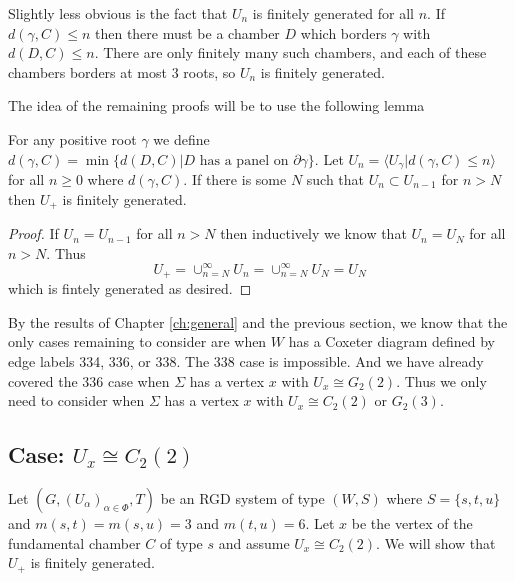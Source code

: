 \documentclass[class=book, crop=false]{standalone}
\begin{document}
Slightly less obvious is the fact that $U_n$ is finitely generated for all $n.$ If $d(\gamma,C)\le n$ then there must be a chamber $D$ which borders $\gamma$ with $d(D,C)\le n.$ There are only finitely many such chambers, and each of these chambers borders at most 3 roots, so $U_n$ is finitely generated.

The idea of the remaining proofs will be to use the following lemma
\begin{lemma} 
	For any positive root $\gamma$ we define $d(\gamma,C)=\min\{d(D,C)|D\text{ has a panel on }\partial \gamma\}.$ Let $U_n=\langle U_\gamma |d(\gamma,C)\le n\rangle$ for all $n\ge 0$ where $d(\gamma,C).$ If there is some $N$ such that $U_n\subset U_{n-1}$ for $n>N$ then $U_+$ is finitely generated.
	\label{lem:fgcond}
\end{lemma}
\begin{proof}
	If $U_n=U_{n-1}$ for all $n> N$ then inductively we know that $U_n=U_N$ for all $n>N.$ Thus
	\[
		U_+=\cup_{n=N}^{\infty}{U_n}=\cup_{n=N}^\infty U_N=U_N
	\]
	which is fintely generated as desired.
\end{proof}

By the results of Chapter \ref{ch:general} and the previous section, we know that the only cases remaining to consider are when $W$ has a Coxeter diagram defined by edge labels 334, 336, or 338. The 338 case is impossible. And we have already covered the 336 case when $\Sigma$ has a vertex $x$ with $U_x\cong G_2(2).$ Thus we only need to consider when $\Sigma$ has a vertex $x$ with $U_x\cong C_2(2)$ or $G_2(3).$

\subsection{Case: $U_x\cong C_2(2)$}

Let $(G,(U_\alpha)_{\alpha\in \Phi},T)$ be an RGD system of type $(W,S)$ where $S=\{s,t,u\}$ and $m(s,t)=m(s,u)=3$ and $m(t,u)=6.$ Let $x$ be the vertex of the fundamental chamber $C$ of type $s$ and assume $U_x\cong C_2(2).$ We will show that $U_+$ is finitely generated.
\end{document}
